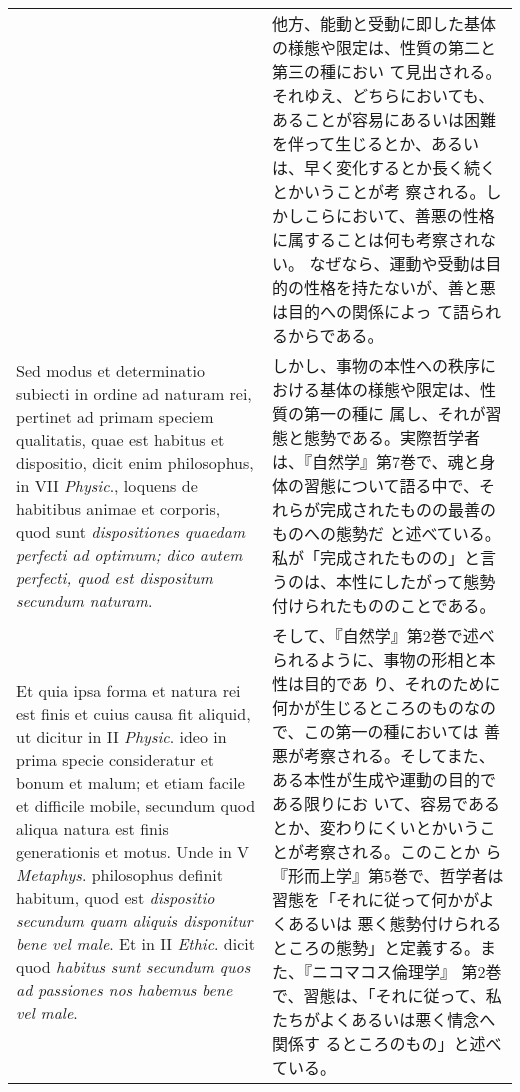 \documentclass[10pt]{jsarticle} %
\begin{document}
\begin{longtable}{p{21em}p{21em}}
&

他方、能動と受動に即した基体の様態や限定は、性質の第二と第三の種におい
て見出される。それゆえ、どちらにおいても、あることが容易にあるいは困難
を伴って生じるとか、あるいは、早く変化するとか長く続くとかいうことが考
察される。しかしこらにおいて、善悪の性格に属することは何も考察されない。
なぜなら、運動や受動は目的の性格を持たないが、善と悪は目的への関係によっ
て語られるからである。


\\


Sed modus et determinatio subiecti in ordine ad naturam rei, pertinet
ad primam speciem qualitatis, quae est habitus et dispositio, dicit
enim philosophus, in VII {\itshape Physic}., loquens de habitibus animae et
corporis, quod sunt {\itshape dispositiones quaedam perfecti ad optimum; dico
autem perfecti, quod est dispositum secundum naturam}.


&

しかし、事物の本性への秩序における基体の様態や限定は、性質の第一の種に
属し、それが習態と態勢である。実際哲学者は、『自然学』第7巻で、魂と身
体の習態について語る中で、それらが完成されたものの最善のものへの態勢だ
と述べている。私が「完成されたものの」と言うのは、本性にしたがって態勢
付けられたもののことである。


\\


Et quia ipsa forma et
natura rei est finis et cuius causa fit aliquid, ut dicitur in II
{\itshape Physic}. ideo in prima specie consideratur et bonum et malum; et etiam
facile et difficile mobile, secundum quod aliqua natura est finis
generationis et motus. Unde in V {\itshape Metaphys}. philosophus definit
habitum, quod est {\itshape dispositio secundum quam aliquis disponitur bene vel
male}. Et in II {\itshape Ethic}. dicit quod {\itshape habitus sunt secundum quos ad
passiones nos habemus bene vel male}. 



&

そして、『自然学』第2巻で述べられるように、事物の形相と本性は目的であ
り、それのために何かが生じるところのものなので、この第一の種においては
善悪が考察される。そしてまた、ある本性が生成や運動の目的である限りにお
いて、容易であるとか、変わりにくいとかいうことが考察される。このことか
ら『形而上学』第5巻で、哲学者は習態を「それに従って何かがよくあるいは
悪く態勢付けられるところの態勢」と定義する。また、『ニコマコス倫理学』
第2巻で、習態は、「それに従って、私たちがよくあるいは悪く情念へ関係す
るところのもの」と述べている。


\end{longtable}
\end{document}
